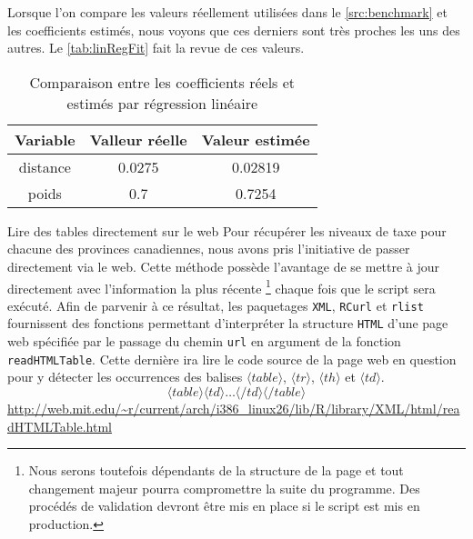 Lorsque l'on compare les valeurs réellement utilisées dans le \autoref{src:benchmark} et les coefficients estimés, nous voyons que ces derniers sont très proches les uns des autres. Le \autoref{tab:linRegFit} fait la revue de ces valeurs. \\

\begin{table}[h]
	\centering
	\begin{tabular}{ccc}
		\textbf{Variable} & \textbf{Valleur réelle} & \textbf{Valeur estimée} \\
		\hline
		distance & 0.0275 & 0.02819 \\
		poids & 0.7 & 0.7254
	\end{tabular}
	\caption{Comparaison entre les coefficients réels et estimés par régression linéaire}
	\label{tab:linRegFit}
\end{table}

\begin{moreInfo}{Lire des tables directement sur le web}
	Pour récupérer les niveaux de taxe pour chacune des provinces canadiennes, nous avons pris l'initiative de passer directement via le web. Cette méthode possède l'avantage de se mettre à jour directement avec l'information la plus récente \footnote{Nous serons toutefois dépendants de la structure de la page et tout changement majeur pourra compromettre la suite du programme. Des procédés de validation devront être mis en place si le script est mis en production.} chaque fois que le script sera exécuté. Afin de parvenir à ce résultat, les paquetages \texttt{XML}, \texttt{RCurl} et \texttt{rlist} fournissent des fonctions permettant d'interpréter la structure \texttt{HTML} d'une page web spécifiée par le passage du chemin \texttt{url} en argument de la fonction \texttt{readHTMLTable}. Cette dernière ira lire le code source de la page web en question pour y détecter les occurrences des balises $\langle table \rangle$, $\langle tr \rangle$, $\langle th \rangle$ et $\langle td \rangle$.  $$\langle table \rangle \langle td \rangle \dots \langle /td \rangle \langle /table \rangle$$
	\url{http://web.mit.edu/~r/current/arch/i386_linux26/lib/R/library/XML/html/readHTMLTable.html}
\end{moreInfo}
